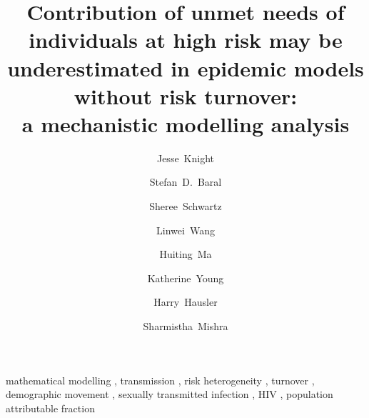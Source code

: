 \begin{frontmatter}
\null\vspace{-2.5cm} %
\title{
  Contribution of unmet needs of individuals at high risk
  may be underestimated in epidemic models without risk turnover:\\
  a mechanistic modelling analysis
}
\author[MAP]{Jesse~Knight}
\author[JHU]{Stefan~D.~Baral}
\author[JHU]{Sheree~Schwartz}
\author[MAP]{Linwei~Wang}
\author[MAP]{Huiting~Ma}
\author[THC]{Katherine~Young}
\author[THC]{Harry~Hausler}      
\author[MAP,IDM,IHP,IMS]{Sharmistha~Mishra}
\address[MAP]{MAP Centre for Urban Health Solutions, Unity Health Toronto}
\address[JHU]{Deptartment of Epidemiology, Johns Hopkins Bloomberg School of Public Health}
\address[THC]{TB HIV Care, South Africa}
\address[IDM]{Department of Medicine, Division of Infectious Disease, University of Toronto}
\address[IHP]{Institute of Health Policy, Management and Evaluation,
  Dalla Lana School of Public Health, University of Toronto}
\address[IMS]{Instituof Medical Sciences, University of Toronto}
\begin{abstract}
  \linespread{1.35}\selectfont %
  
\end{abstract}
\begin{keyword}
  mathematical modelling \sep
  transmission \sep
  risk heterogeneity \sep
  turnover \sep
  demographic movement \sep
  sexually transmitted infection \sep
  HIV \sep
  population attributable fraction
\end{keyword}
\end{frontmatter}
\clearpage
{}
\setcounter{tocdepth}{2}
\tableofcontents
\clearpage
{}
\setcounter{page}{1}
